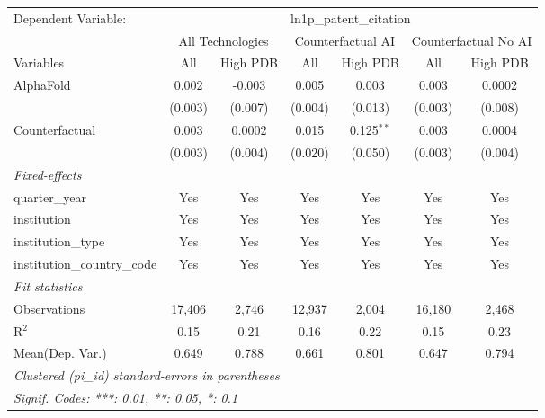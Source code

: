 \begingroup
\centering
\begin{tabular}{lcccccc}
   \tabularnewline \midrule \midrule
   Dependent Variable: & \multicolumn{6}{c}{ln1p\_patent\_citation}\\
 & \multicolumn{2}{c}{All Technologies} & \multicolumn{2}{c}{Counterfactual AI} & \multicolumn{2}{c}{Counterfactual No AI} \\
\cmidrule(lr){1-1}\cmidrule(lr){2-3} \cmidrule(lr){4-5} \cmidrule(lr){6-7}
Variables & \multicolumn{1}{c}{All} & \multicolumn{1}{c}{High PDB} & \multicolumn{1}{c}{All} & \multicolumn{1}{c}{High PDB} & \multicolumn{1}{c}{All} & \multicolumn{1}{c}{High PDB} \\
\cmidrule(lr){1-1}\cmidrule(lr){2-2} \cmidrule(lr){3-3} \cmidrule(lr){4-4} \cmidrule(lr){5-5} \cmidrule(lr){6-6} \cmidrule(lr){7-7}
   AlphaFold                    & 0.002   & -0.003  & 0.005   & 0.003        & 0.003   & 0.0002\\   
                                & (0.003) & (0.007) & (0.004) & (0.013)      & (0.003) & (0.008)\\   
   Counterfactual               & 0.003   & 0.0002  & 0.015   & 0.125$^{**}$ & 0.003   & 0.0004\\   
                                & (0.003) & (0.004) & (0.020) & (0.050)      & (0.003) & (0.004)\\   
   \midrule
   \emph{Fixed-effects}\\
   quarter\_year                & Yes     & Yes     & Yes     & Yes          & Yes     & Yes\\  
   institution                  & Yes     & Yes     & Yes     & Yes          & Yes     & Yes\\  
   institution\_type            & Yes     & Yes     & Yes     & Yes          & Yes     & Yes\\  
   institution\_country\_code   & Yes     & Yes     & Yes     & Yes          & Yes     & Yes\\  
   \midrule
   \emph{Fit statistics}\\
   Observations                 & 17,406  & 2,746   & 12,937  & 2,004        & 16,180  & 2,468\\  
   R$^2$                        & 0.15    & 0.21    & 0.16    & 0.22         & 0.15    & 0.23\\  
Mean(Dep. Var.) & 0.649 & 0.788 & 0.661 & 0.801 & 0.647 & 0.794 \\
   \midrule \midrule
   \multicolumn{7}{l}{\emph{Clustered (pi\_id) standard-errors in parentheses}}\\
   \multicolumn{7}{l}{\emph{Signif. Codes: ***: 0.01, **: 0.05, *: 0.1}}\\
\end{tabular}
\par\endgroup
